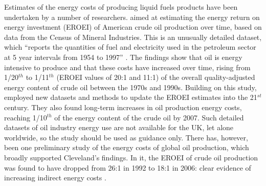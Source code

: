 \documentclass[a4paper, 11pt, twoside]{Thesis}
\begin{document}
Estimates of the energy costs of producing liquid fuels products have been
undertaken by a number of researchers. \citet{Cleveland2005} aimed 
at estimating the energy return on energy investment (EROEI) of American crude
oil production over time, based on data from the Census of Mineral Industries.
This is an unusually detailed dataset, which ``reports the quantities of fuel
and electricity used in the petroleum sector at 5 year intervals from 1954 to
1997'' \citep[p.~777]{Cleveland2005}. The findings show that oil is
energy intensive to produce and that these costs have increased
over time, rising from 1/20$^{th}$ to 1/11$^{th}$ (EROEI values of 20:1 and 11:1) of
the overall quality-adjusted energy content of crude oil between the 1970s and
1990s. Building on this study, \citet{Guilford2011} employed new datasets and
methods to update the EROEI estimates into the 21$^{st}$ century. They also found
long-term increases in oil production energy costs, reaching 1/10$^{th}$ of the
energy content of the crude oil by 2007.
Such detailed datasets of oil industry energy use are not available for the UK,
let alone worldwide, so the study should be used as guidance only. There has,
however, been one preliminary study of the energy costs of global oil
production, which broadly supported Cleveland's findings. In it, the
EROEI of crude oil production was found to have dropped from
26:1 in 1992 to 18:1 in 2006: clear evidence of increasing indirect energy
costs \citep{Gagnon2009}.
\end{document}
